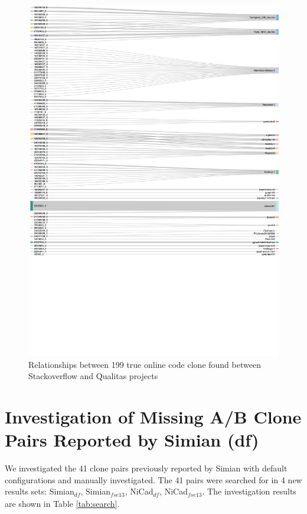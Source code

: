 \documentclass{IEEEtran}
\begin{document}
\begin{figure}[H]
	\centering
	\includegraphics[width=1\linewidth]{Sankey_proj}
	\caption{Relationships between 199 true online code clone found between Stackoverflow and Qualitas projects}
	\label{fig:sankey}
\end{figure}


\newpage

\section*{Investigation of Missing A/B Clone Pairs Reported by Simian (df)}
We investigated the 41 clone pairs previously reported by Simian with default configurations and manually investigated. The 41 pairs were searched for in 4 new results sets: Simian$_{df}$, Simian$_{\mathrm{\textit{fse13}}}$, NiCad$_{df}$, NiCad$_{\mathrm{\textit{fse13}}}$. The investigation results are shown in Table \ref{tab:search}.
\end{document}
